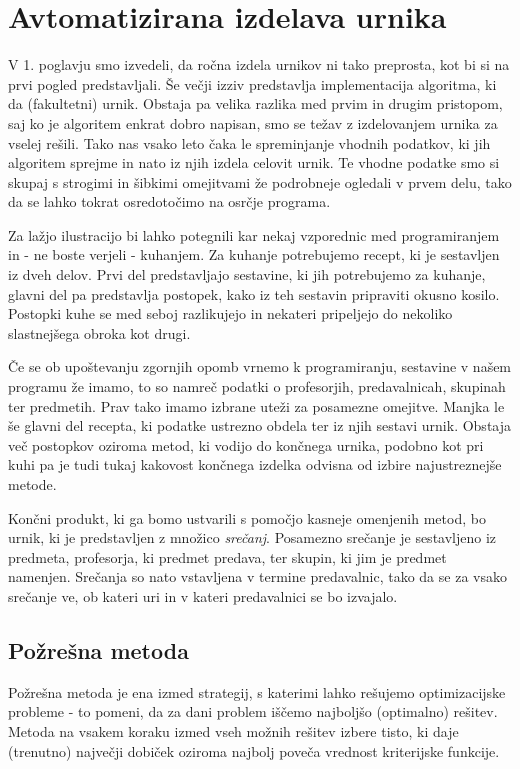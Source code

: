 \documentclass[a4paper,10pt]{article}
\begin{document}
\section{Avtomatizirana izdelava urnika}

V 1. poglavju smo izvedeli, da ročna izdela urnikov ni tako preprosta, kot bi si
na prvi pogled predstavljali. Še večji izziv predstavlja implementacija algoritma, ki da
(fakultetni) urnik. Obstaja pa velika razlika med prvim in drugim pristopom, saj ko je
algoritem enkrat dobro napisan, smo se težav z izdelovanjem urnika za vselej rešili.
Tako nas vsako leto čaka le spreminjanje vhodnih podatkov, ki jih algoritem sprejme in
nato iz njih izdela celovit urnik. Te vhodne podatke smo si skupaj s strogimi in šibkimi
omejitvami že podrobneje ogledali v prvem delu, tako da se lahko tokrat osredotočimo na
osrčje programa.

Za lažjo ilustracijo bi lahko potegnili kar nekaj vzporednic med programiranjem in - ne
boste verjeli - kuhanjem. Za kuhanje potrebujemo recept, ki je sestavljen iz dveh delov.
Prvi del predstavljajo sestavine, ki jih potrebujemo za kuhanje, glavni del pa predstavlja
postopek, kako iz teh sestavin pripraviti okusno kosilo. Postopki kuhe se med seboj
razlikujejo in nekateri pripeljejo do nekoliko slastnejšega obroka kot drugi.

Če se ob upoštevanju zgornjih opomb vrnemo k programiranju, sestavine v našem programu že
imamo, to so namreč podatki o profesorjih, predavalnicah, skupinah ter predmetih. Prav tako
imamo izbrane uteži za posamezne omejitve. Manjka le še glavni del recepta, ki podatke
ustrezno obdela ter iz njih sestavi urnik. Obstaja več postopkov oziroma metod, ki vodijo
do končnega urnika, podobno kot pri kuhi pa je tudi tukaj kakovost končnega izdelka odvisna
od izbire najustreznejše metode.

Končni produkt, ki ga bomo ustvarili s pomočjo kasneje omenjenih metod, bo urnik, ki je
predstavljen z množico \emph{srečanj}. Posamezno srečanje je sestavljeno iz predmeta,
profesorja, ki predmet predava, ter skupin, ki jim je predmet namenjen. Srečanja so nato
vstavljena v termine predavalnic, tako da se za vsako srečanje ve, ob kateri uri in v
kateri predavalnici se bo izvajalo.

\subsection{Požrešna metoda}

Požrešna metoda je ena izmed strategij, s katerimi lahko rešujemo optimizacijske probleme -
to pomeni, da za dani problem iščemo najboljšo (optimalno) rešitev. Metoda na vsakem koraku
izmed vseh možnih rešitev izbere  tisto, ki daje (trenutno) največji dobiček oziroma najbolj
poveča vrednost kriterijske funkcije.
\end{document}
